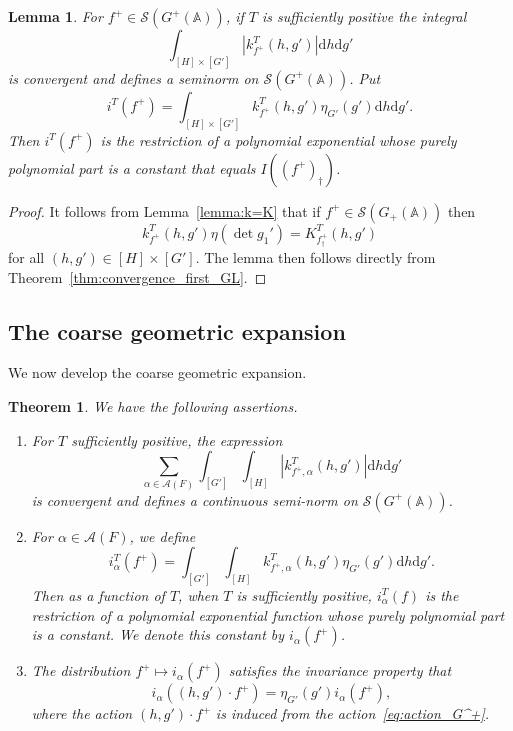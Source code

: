 \documentclass[letterpaper,11pt]{amsart}
\newcommand{\bA}{\mathbb{A}}
\newcommand{\cA}{\mathcal{A}}
\newcommand{\cS}{\mathcal{S}}
\newcommand{\rd}{\mathrm{d}}
\newcommand{\<}{\negthickspace}
\providecommand{\Abs}[1]{\left\lvert#1\right\rvert}
\theoremstyle{definition}
\theoremstyle{plain}
\newtheorem{theorem}[definition]{Theorem}
\newtheorem{lemma}[definition]{Lemma}
\theoremstyle{remark}
\numberwithin{equation}{section}
\begin{document}
\begin{lemma}   \label{lem:integration_of_modified_kernel_seminorm_linear}
For $f^+ \in \cS(G^+(\bA))$, if $T$ is sufficiently positive the
integral
    \[
    \int_{[H]\times [G']} \Abs{k_{f^+}^T(h, g')} \rd h \rd g'
    \]
is convergent and defines a seminorm on $\cS(G^+(\bA))$. Put
    \[
    i^T(f^+) = \int_{[H]\times [G']}k_{f^+}^T(h, g')
    \eta_{G'}(g') \rd h \rd g'.
    \]
Then $i^T(f^+)$ is the restriction of a polynomial exponential whose purely
polynomial part is a constant that equals $I((f^+)_\dag)$.
\end{lemma}

\begin{proof}
It follows from Lemma~\ref{lemma:k=K} that if $f^+ \in \cS(G_+(\bA))$ then
    \[
    k_{f^+}^T(h, g') \eta(\det g_1') = K_{f^+_{\dag}}^T(h, g')
    \]
for all $(h, g') \in [H] \times [G']$. The lemma then follows directly from
Theorem~\ref{thm:convergence_first_GL}.
\end{proof}




\subsection{The coarse geometric expansion}
We now develop the coarse geometric expansion.

\begin{theorem} \label{thm:geometric_linear}
We have the following assertions.
\begin{enumerate}
\item For $T$ sufficiently positive, the expression
     \begin{equation*}
        \sum_{\alpha \in \cA(F)} \int_{[G']}  \int_{[H]}
        \left| k_{f^+, \alpha}^T(h, g') \right|
        \rd h \rd g'
        \end{equation*}
    is convergent and defines a continuous semi-norm on $\cS(G^+(\bA))$.

\item For $\alpha \in \cA(F)$, we define
    \[
    i_\alpha^T(f^+) = \int_{[G']} \int_{[H]} k^T_{f^+, \alpha}(h, g')
    \eta_{G'}(g') \rd h \rd g'.
    \]
    Then as a function of $T$, when $T$ is sufficiently positive, $i^T_\alpha(f)$ is the restriction of a
    polynomial exponential function whose purely polynomial part is a constant. We
    denote this constant by $i_{\alpha}(f^+)$.

\item The distribution $f^+ \mapsto i_\alpha(f^+)$ satisfies the invariance
    property that
        \[
        i_{\alpha}((h, g') \cdot f^+) =
        \eta_{G'}(g')  i_{\alpha}(f^+),
        \]
    where the action $(h, g') \cdot f^+$ is induced from the
    action~\eqref{eq:action_G^+}.
\end{enumerate}
\end{theorem}
\end{document}
